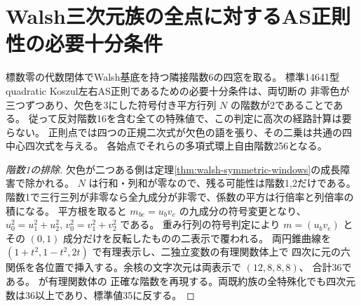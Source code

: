 \section{Walsh三次元族の全点に対するAS正則性の必要十分条件}
\label{sec:walsh-normal-quadrics}
\begin{theorem}\label{thm:walsh-normal-quadrics}
標数零の代数閉体でWalsh基底を持つ隣接階数6の四窓を取る。
標準14641型quadratic Koszul左右AS正則であるための必要十分条件は、両切断の
非零色が三つずつあり、欠色を3にした符号付き平方行列 $N$ の階数が2であることである。
従って反対階数16を含む全ての特殊値で、この判定に高次の経路計算は要らない。
正則点では四つの正規二次式が欠色の語を張り、その二乗は共通の四中心四次式を与える。
各始点でそれらの多項式環上自由階数256となる。
\end{theorem}
\begin{proof}[階数1の排除]
欠色が二つある側は定理\ref{thm:walsh-symmetric-windows}の成長障害で除かれる。
$N$ は行和・列和が零なので、残る可能性は階数1,2だけである。
階数1で三行三列が非零なら全九成分が非零で、係数の平方は行倍率と列倍率の積になる。
平方根を取ると $m_{be}=u_b v_e$ の九成分の符号変更となり、
$u_0^2=u_1^2+u_2^2$, $v_0^2=v_1^2+v_2^2$ である。
重み行列の符号判定により $m=(u_bv_e)$ とその $(0,1)$ 成分だけを反転したものの二表示で覆われる。
両円錐曲線を $(1+t^2,1-t^2,2t)$ で有理表示し、二独立変数の有理関数体上で
四次に元の六関係を各位置で挿入する。余核の文字次元は両表示で $(12,8,8,8)$、
合計36である。 が有理関数体の
正確な階数を再現する。両既約族の全特殊化でも四次元数は36以上であり、標準値35に反する。
\end{proof}

